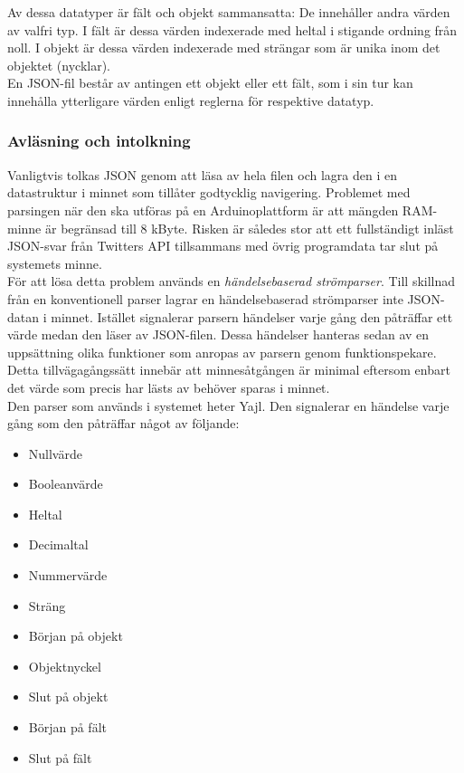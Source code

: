 \documentclass[a4paper,11pt]{article}
\begin{document}
Av dessa datatyper är fält och objekt sammansatta: De innehåller andra värden av valfri typ. I fält är dessa värden indexerade med heltal i stigande ordning från noll. I objekt är dessa värden indexerade med strängar som är unika inom det objektet (nycklar). \\

En JSON-fil består av antingen ett objekt eller ett fält, som i sin tur kan innehålla ytterligare värden enligt reglerna för respektive datatyp. \\

\subsubsection{Avläsning och intolkning}
Vanligtvis tolkas JSON genom att läsa av hela filen och lagra den i en datastruktur i minnet som tillåter godtycklig navigering. Problemet med parsingen när den ska utföras på en Arduinoplattform är att mängden RAM-minne är begränsad till 8 kByte. Risken är således stor att ett fullständigt inläst JSON-svar från Twitters API tillsammans med övrig programdata tar slut på systemets minne. \\

För att lösa detta problem används en {\it händelsebaserad strömparser}. Till skillnad från en konventionell parser lagrar en händelsebaserad strömparser inte JSON-datan i minnet. Istället signalerar parsern händelser varje gång den påträffar ett värde medan den läser av JSON-filen. Dessa händelser hanteras sedan av en uppsättning olika funktioner som anropas av parsern genom funktionspekare. Detta tillvägagångssätt innebär att minnesåtgången är minimal eftersom enbart det värde som precis har lästs av behöver sparas i minnet. \\

Den parser som används i systemet heter Yajl. Den signalerar en händelse varje gång som den påträffar något av följande:

	\begin{itemize}
    	\item Nullvärde
    	\item Booleanvärde
    	\item Heltal
    	\item Decimaltal
    	\item Nummervärde
    	\item Sträng
    	\item Början på objekt
    	\item Objektnyckel
    	\item Slut på objekt
    	\item Början på fält
    	\item Slut på fält
	\end{itemize}
	
\end{document}
